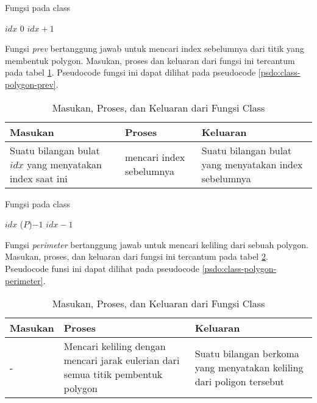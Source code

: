 \begin{algorithm}
    \caption{Fungsi  pada class }
	\label{psdo:class-polygon-next}
	\begin{algorithmic}[1]
        \Require $ idx $
            \State \Return $0$
        \Else
            \State \Return $idx+1$
		\EndIf
	\end{algorithmic}
\end{algorithm}
\newpage
Fungsi \textit{prev} bertanggung jawab untuk mencari index sebelumnya dari titik yang membentuk polygon. Masukan, proses dan keluaran dari fungsi ini tercantum pada tabel \ref{tab:class-polygon-prev}. Pseudocode fungsi ini dapat dilihat pada pseudocode \ref{psdo:class-polygon-prev}.

\begin{table}[]
	\Centering
	\begin{tabular}{|p{3cm}|p{3cm}|p{3cm}|}
	\hline
	Masukan   & Proses     & Keluaran \\ \hline
	Suatu bilangan bulat $idx$ yang menyatakan index saat ini & mencari index sebelumnya &   Suatu bilangan bulat yang menyatakan index sebelumnya     \\ \hline
	\end{tabular}
	\caption{Masukan, Proses, dan Keluaran dari Fungsi  Class }
	\label{tab:class-polygon-prev}
\end{table}

\begin{algorithm}
    \caption{Fungsi  pada class }
	\label{psdo:class-polygon-prev}
	\begin{algorithmic}[1]
        \Require $ idx $
            \State \Return {}($P$)$-1$
        \Else
            \State \Return $idx-1$
		\EndIf
	\end{algorithmic}
\end{algorithm}
\newpage
Fungsi \textit{perimeter} bertanggung jawab untuk mencari keliling dari sebuah polygon. Masukan, proses, dan keluaran dari fungsi ini tercantum pada tabel \ref{tab:class-polygon-perimeter}. Pseudocode funsi ini dapat dilihat pada pseudocode \ref{psdo:class-polygon-perimeter}.
\begin{table}[]
	\Centering
	\begin{tabular}{|p{3cm}|p{3cm}|p{3cm}|}
	\hline
	Masukan   & Proses     & Keluaran \\ \hline
	- & Mencari keliling dengan mencari jarak eulerian dari semua titik pembentuk polygon &   Suatu bilangan berkoma yang menyatakan keliling dari poligon tersebut     \\ \hline
	\end{tabular}
	\caption{Masukan, Proses, dan Keluaran dari Fungsi  Class }
	\label{tab:class-polygon-perimeter}
\end{table}


